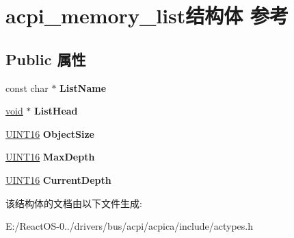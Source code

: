 \hypertarget{structacpi__memory__list}{}\section{acpi\+\_\+memory\+\_\+list结构体 参考}
\label{structacpi__memory__list}
\subsection*{Public 属性}
\begin{DoxyCompactItemize}
\item 
\mbox{\label{structacpi__memory__list_a24284e0207fadff561dc84119d907cc1}} 
const char $\ast$ {\bfseries List\+Name}
\item 
\mbox{\label{structacpi__memory__list_ae039574105847f507cd8590054008423}} 
\hyperlink{interfacevoid}{void} $\ast$ {\bfseries List\+Head}
\item 
\mbox{\label{structacpi__memory__list_a6c50de52af72679e2bd7e8e6c56f53d6}} 
\hyperlink{_processor_bind_8h_a09f1a1fb2293e33483cc8d44aefb1eb1}{U\+I\+N\+T16} {\bfseries Object\+Size}
\item 
\mbox{\label{structacpi__memory__list_adca6b5d47a6ef4bba732e3b8be5f993f}} 
\hyperlink{_processor_bind_8h_a09f1a1fb2293e33483cc8d44aefb1eb1}{U\+I\+N\+T16} {\bfseries Max\+Depth}
\item 
\mbox{\label{structacpi__memory__list_abf4ac3a7078b790b61b5ed490801c265}} 
\hyperlink{_processor_bind_8h_a09f1a1fb2293e33483cc8d44aefb1eb1}{U\+I\+N\+T16} {\bfseries Current\+Depth}
\end{DoxyCompactItemize}


该结构体的文档由以下文件生成\+:\begin{DoxyCompactItemize}
\item 
E\+:/\+React\+O\+S-\/0../drivers/bus/acpi/acpica/include/actypes.\+h\end{DoxyCompactItemize}
